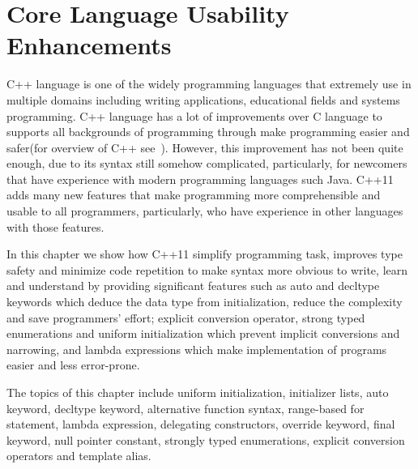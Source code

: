 \documentclass[11pt]{report}
\begin{document}
\chapter{Core Language Usability Enhancements}
\label{chapter: Usability Enhancements}
C++ language is one of the widely programming languages that extremely use in multiple domains including writing applications, educational fields and systems programming. C++ language has a lot of improvements over C language to supports all backgrounds of programming through make programming easier and safer(for overview of C++ see~\cite{Cppreference:2012:Cpp11}). However, this improvement has not been quite enough, due to its syntax still somehow complicated, particularly, for newcomers that have experience with modern programming languages such Java. C++11 adds many new features that make programming more comprehensible and usable to all programmers, particularly, who have experience in other languages with those features.

In this chapter we show how C++11 simplify programming task, improves type safety and minimize code repetition to make syntax more obvious to write, learn and understand by providing significant features such as auto and decltype keywords which deduce the data type from initialization, reduce the complexity and save programmers' effort; explicit conversion operator, strong typed enumerations and uniform initialization which prevent implicit conversions and narrowing, and lambda expressions which make implementation of programs easier and less error-prone.

The topics of this chapter include uniform initialization, initializer lists, auto keyword, decltype keyword, alternative function syntax, range-based for statement, lambda expression, delegating constructors, override keyword, final keyword, null pointer constant, strongly typed enumerations, explicit conversion operators and template alias.
\end{document}
